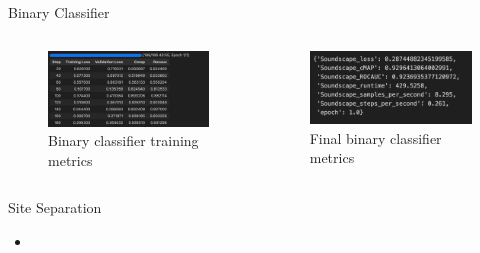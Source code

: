 \begin{frame}{Binary Classifier}
    \begin{columns}
        \begin{column}{0.5\textwidth}
            \begin{figure}
                \centering
                \includegraphics[height=1.0\textheight,width=1.0\textwidth,keepaspectratio]{images/binary_classifier_metrics_1.png}
                \caption{Binary classifier training metrics}
            \end{figure}
        \end{column}
        \begin{column}{0.5\textwidth}
            \begin{figure}
                \centering
                \includegraphics[height=1.0\textheight,width=1.0\textwidth,keepaspectratio]{images/binary_classifier_metrics_2.png}
                \caption{Final binary classifier metrics}
            \end{figure}
        \end{column}
    \end{columns}
\end{frame}

\begin{frame}{Site Separation}
    \begin{itemize}
        \item 
    \end{itemize}
\end{frame}

